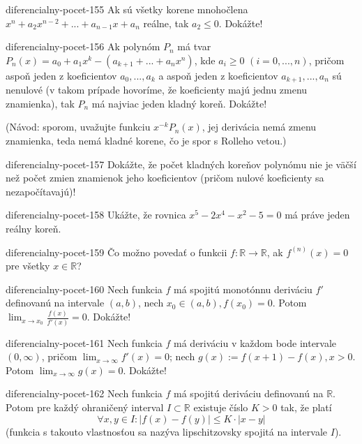 \begin{defproblem}{diferencialny-pocet-155}
Ak sú všetky korene mnohočlena $x^n+a_2x^{n-2}+...+a_{n-1}x+a_n$ reálne, tak $a_2\leq 0$. Dokážte!
\end{defproblem}

\begin{defproblem}{diferencialny-pocet-156}
Ak polynóm $P_n$ má tvar $P_n(x)=a_0+a_1x^k-(a_{k+1}+...+a_nx^{n})$, kde $a_i \geq 0$ $(i=0,...,n)$, pričom aspoň jeden z koeficientov $a_0,...,a_k$ a aspoň jeden z koeficientov $a_{k+1},...,a_n$ sú nenulové (v takom prípade hovoríme, že koeficienty majú jednu zmenu znamienka), tak $P_n$ má najviac jeden kladný koreň. Dokážte!

(Návod: sporom, uvažujte funkciu $x^{-k}P_n(x)$, jej derivácia nemá zmenu znamienka, teda nemá kladné korene, čo je spor s Rolleho vetou.)
\end{defproblem}

\begin{defproblem}{diferencialny-pocet-157}
Dokážte, že počet kladných koreňov polynómu nie je väčší než počet zmien znamienok jeho koeficientov (pričom nulové koeficienty sa nezapočítavajú)!
\end{defproblem}

\begin{defproblem}{diferencialny-pocet-158}
Ukážte, že rovnica $x^5-2x^4-x^2-5=0$ má práve jeden reálny koreň.
\end{defproblem}

\begin{defproblem}{diferencialny-pocet-159}
Čo možno povedať o funkcii $f:\mathbb{R}\rightarrow\mathbb{R}$, ak $f^{(n)}(x)=0$ pre všetky $x\in\mathbb{R}$?
\end{defproblem}

\begin{defproblem}{diferencialny-pocet-160}
Nech funkcia $f$ má spojitú monotónnu deriváciu $f'$ definovanú na intervale $(a,b)$, nech $x_0\in (a,b),f(x_0)=0$. Potom $\lim_{x\rightarrow x_0}\frac{f(x)}{f'(x)}=0$. Dokážte!
\end{defproblem}

\begin{defproblem}{diferencialny-pocet-161}
Nech funkcia $f$ má deriváciu v každom bode intervale $(0,\infty)$, pričom $\lim_{x\rightarrow \infty}f'(x)=0$; nech $g(x):=f(x+1)-f(x),x>0$. Potom $\lim_{x\rightarrow \infty}g(x)=0$. Dokážte!
\end{defproblem}

\begin{defproblem}{diferencialny-pocet-162}
Nech funkcia $f$ má spojitú deriváciu definovanú na $\mathbb{R}$. Potom pre každý ohraničený interval $I \subset \mathbb{R}$ existuje číslo $K>0$ tak, že platí
$$\forall x,y\in I: |f(x)-f(y)|\leq K\cdot |x-y|$$
(funkcia s takouto vlastnosťou sa nazýva lipschitzovsky spojitá na intervale $I$).
\end{defproblem}

